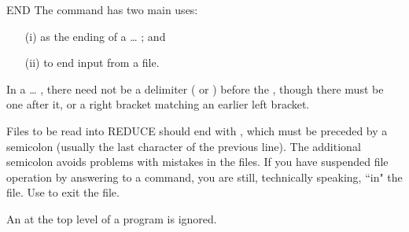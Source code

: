 \begin{Command}[end]{END}
The command  has two main uses:
\begin{itemize}
\item[(i)]
as the ending of a \ldots{} ; and
\item[(ii)]
to end input from a file.
\end{itemize}

\begin{Comments}
In a \ldots{} , there need not be a delimiter
(\name{;} or \name{\$}) before the , though there must be one
after it, or a right bracket matching an earlier left bracket.

Files to be read into REDUCE should end with , which must be
preceded by a semicolon (usually the last character of the previous line).
The additional semicolon avoids problems with mistakes in the files.  If
you have suspended file operation by answering  to a 
command, you are still, technically speaking, ``in" the file.  Use
 to exit the file.

An  at the top level of a program is ignored.
\end{Comments}
\end{Command}


